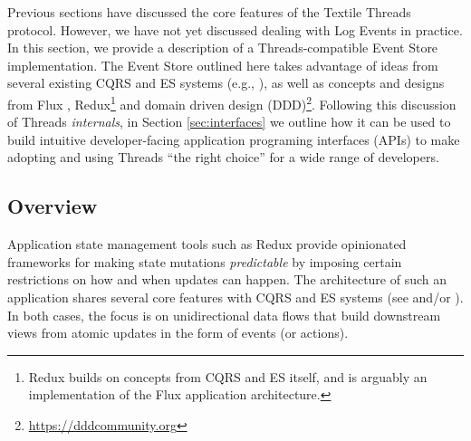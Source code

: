 \documentclass{textile}
\begin{document}
Previous sections have discussed the core features of the Textile Threads protocol. However, we have not yet discussed dealing with Log Events in practice. In this section, we provide a description of a Threads-compatible Event Store implementation. The Event Store outlined here takes advantage of ideas from several existing CQRS and ES systems (e.g., \cite{ereminReduxInspiredBackend2019}), as well as concepts and designs from Flux \cite{facebookFluxInDepthOverview2019}, Redux\footnote{Redux builds on concepts from CQRS and ES itself, and is arguably an implementation of the Flux application architecture.} \cite{reduxMotivation} and domain driven design \cite{evansDomaindrivenDesignTackling2004a} (DDD)\footnote{\url{https://dddcommunity.org}}. Following this discussion of Threads \emph{internals}, in Section \ref{sec:interfaces} we outline how it can be used to build intuitive developer-facing application programing interfaces (APIs) to make adopting and using Threads ``the right choice'' for a wide range of developers.

\subsection{Overview}

Application state management tools such as Redux provide opinionated frameworks for making state mutations \emph{predictable} by imposing certain restrictions on how and when updates can happen. The architecture of such an application shares several core features with CQRS and ES systems (see \cite{facebookFluxInDepthOverview2019} and/or \cite{abramovCaseFlux2015}). In both cases, the focus is on unidirectional data flows that build downstream views from atomic updates in the form of events (or actions).
\end{document}
